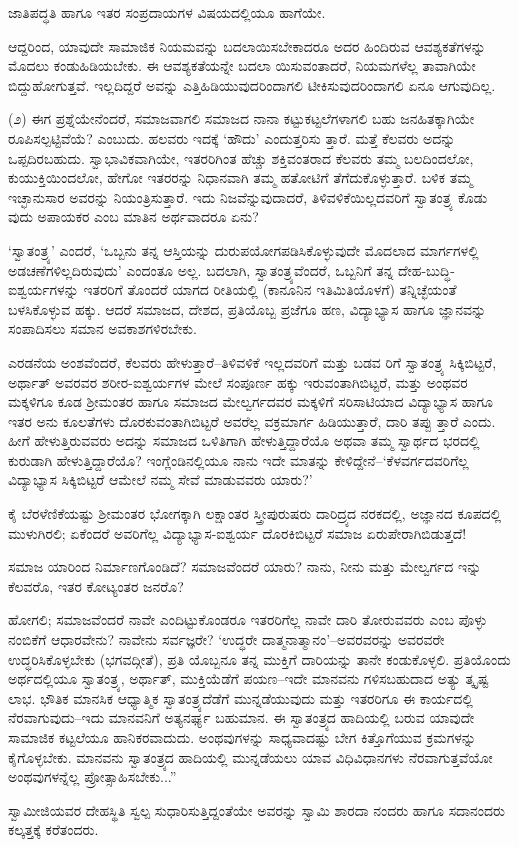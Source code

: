 ಜಾತಿಪದ್ಧತಿ ಹಾಗೂ ಇತರ ಸಂಪ್ರದಾಯಗಳ ವಿಷಯದಲ್ಲಿಯೂ ಹಾಗೆಯೇ.

ಆದ್ದರಿಂದ, ಯಾವುದೇ ಸಾಮಾಜಿಕ ನಿಯಮವನ್ನು ಬದಲಾಯಿಸಬೇಕಾದರೂ ಅದರ ಹಿಂದಿರುವ ಆವಶ್ಯಕತೆಗಳನ್ನು ಮೊದಲು ಕಂಡುಹಿಡಿಯಬೇಕು. ಈ ಆವಶ್ಯಕತೆಯನ್ನೇ ಬದಲಾ ಯಿಸುವಂತಾದರೆ, ನಿಯಮಗಳೆಲ್ಲ ತಾವಾಗಿಯೇ ಬಿದ್ದುಹೋಗುತ್ತವೆ. ಇಲ್ಲದಿದ್ದರೆ ಅವನ್ನು ಎತ್ತಿಹಿಡಿಯುವುದರಿಂದಾಗಲಿ ಟೀಕಿಸುವುದರಿಂದಾಗಲಿ ಏನೂ ಆಗುವುದಿಲ್ಲ.

(೨) ಈಗ ಪ್ರಶ್ನೆಯೇನೆಂದರೆ, ಸಮಾಜವಾಗಲಿ ಸಮಾಜದ ನಾನಾ ಕಟ್ಟುಕಟ್ಟಲೆಗಳಾಗಲಿ ಬಹು ಜನಹಿತಕ್ಕಾಗಿಯೇ ರೂಪಿಸಲ್ಪಟ್ಟಿವೆಯೆ? ಎಂಬುದು. ಹಲವರು ಇದಕ್ಕೆ ‘ಹೌದು’ ಎಂದುತ್ತರಿಸು ತ್ತಾರೆ. ಮತ್ತೆ ಕೆಲವರು ಅದನ್ನು ಒಪ್ಪದಿರಬಹುದು. ಸ್ವಾಭಾವಿಕವಾಗಿಯೇ, ಇತರರಿಗಿಂತ ಹೆಚ್ಚು ಶಕ್ತಿವಂತರಾದ ಕೆಲವರು ತಮ್ಮ ಬಲದಿಂದಲೋ, ಕುಯುಕ್ತಿಯಿಂದಲೋ, ಹೇಗೋ ಇತರರನ್ನು ನಿಧಾನವಾಗಿ ತಮ್ಮ ಹತೋಟಿಗೆ ತೆಗೆದುಕೊಳ್ಳುತ್ತಾರೆ. ಬಳಿಕ ತಮ್ಮ ಇಚ್ಛಾನುಸಾರ ಅವರನ್ನು ನಿಯಂತ್ರಿಸುತ್ತಾರೆ. ಇದು ನಿಜವೆನ್ನುವುದಾದರೆ, ತಿಳಿವಳಿಕೆಯಿಲ್ಲದವರಿಗೆ ಸ್ವಾತಂತ್ರ್ಯ ಕೊಡು ವುದು ಅಪಾಯಕರ ಎಂಬ ಮಾತಿನ ಅರ್ಥವಾದರೂ ಏನು?

‘ಸ್ವಾತಂತ್ರ್ಯ’ ಎಂದರೆ, ‘ಒಬ್ಬನು ತನ್ನ ಆಸ್ತಿಯನ್ನು ದುರುಪಯೋಗಪಡಿಸಿಕೊಳ್ಳುವುದೇ ಮೊದಲಾದ ಮಾರ್ಗಗಳಲ್ಲಿ ಅಡಚಣೆಗಳಿಲ್ಲದಿರುವುದು’ ಎಂದಂತೂ ಅಲ್ಲ. ಬದಲಾಗಿ, ಸ್ವಾತಂತ್ರ್ಯವೆಂದರೆ, ಒಬ್ಬನಿಗೆ ತನ್ನ ದೇಹ-ಬುದ್ಧಿ-ಐಶ್ವರ್ಯಗಳನ್ನು ಇತರರಿಗೆ ತೊಂದರೆ ಯಾಗದ ರೀತಿಯಲ್ಲಿ (ಕಾನೂನಿನ ಇತಿಮಿತಿಯೊಳಗೆ) ತನ್ನಿಚ್ಛೆಯಂತೆ ಬಳಸಿಕೊಳ್ಳುವ ಹಕ್ಕು. ಆದರೆ ಸಮಾಜದ, ದೇಶದ, ಪ್ರತಿಯೊಬ್ಬ ಪ್ರಜೆಗೂ ಹಣ, ವಿದ್ಯಾಭ್ಯಾಸ ಹಾಗೂ ಜ್ಞಾನವನ್ನು ಸಂಪಾದಿಸಲು ಸಮಾನ ಅವಕಾಶಗಳಿರಬೇಕು.

ಎರಡನೆಯ ಅಂಶವೆಂದರೆ, ಕೆಲವರು ಹೇಳುತ್ತಾರೆ–ತಿಳಿವಳಿಕೆ ಇಲ್ಲದವರಿಗೆ ಮತ್ತು ಬಡವ ರಿಗೆ ಸ್ವಾತಂತ್ರ್ಯ ಸಿಕ್ಕಿಬಿಟ್ಟರೆ, ಅರ್ಥಾತ್ ಅವರವರ ಶರೀರ-ಐಶ್ವರ್ಯಗಳ ಮೇಲೆ ಸಂಪೂರ್ಣ ಹಕ್ಕು ಇರುವಂತಾಗಿಬಿಟ್ಟರೆ, ಮತ್ತು ಅಂಥವರ ಮಕ್ಕಳಿಗೂ ಕೂಡ ಶ್ರೀಮಂತರ ಹಾಗೂ ಸಮಾಜದ ಮೇಲ್ವರ್ಗದವರ ಮಕ್ಕಳಿಗೆ ಸರಿಸಾಟಿಯಾದ ವಿದ್ಯಾಭ್ಯಾಸ ಹಾಗೂ ಇತರ ಅನು ಕೂಲತೆಗಳು ದೊರಕುವಂತಾಗಿಬಿಟ್ಟರೆ ಅವರೆಲ್ಲ ವಕ್ರಮಾರ್ಗ ಹಿಡಿಯುತ್ತಾರೆ, ದಾರಿ ತಪ್ಪು ತ್ತಾರೆ ಎಂದು. ಹೀಗೆ ಹೇಳುತ್ತಿರುವವರು ಅದನ್ನು ಸಮಾಜದ ಒಳಿತಿಗಾಗಿ ಹೇಳುತ್ತಿದ್ದಾರೆಯೊ ಅಥವಾ ತಮ್ಮ ಸ್ವಾರ್ಥದ ಭರದಲ್ಲಿ ಕುರುಡಾಗಿ ಹೇಳುತ್ತಿದ್ದಾರೆಯೊ? ಇಂಗ್ಲೆಂಡಿನಲ್ಲಿಯೂ ನಾನು ಇದೇ ಮಾತನ್ನು ಕೇಳಿದ್ದೇನೆ–‘ಕೆಳವರ್ಗದವರಿಗೆಲ್ಲ ವಿದ್ಯಾಭ್ಯಾಸ ಸಿಕ್ಕಿಬಿಟ್ಟರೆ ಆಮೇಲೆ ನಮ್ಮ ಸೇವೆ ಮಾಡುವವರು ಯಾರು?’

ಕೈ ಬೆರಳೆಣಿಕೆಯಷ್ಟು ಶ್ರೀಮಂತರ ಭೋಗಕ್ಕಾಗಿ ಲಕ್ಷಾಂತರ ಸ್ತ್ರೀಪುರುಷರು ದಾರಿದ್ರ್ಯದ ನರಕದಲ್ಲಿ, ಅಜ್ಞಾನದ ಕೂಪದಲ್ಲಿ ಮುಳುಗಿರಲಿ; ಏಕೆಂದರೆ ಅವರಿಗೆಲ್ಲ ವಿದ್ಯಾಭ್ಯಾಸ-ಐಶ್ವರ್ಯ ದೊರಕಿಬಿಟ್ಟರೆ ಸಮಾಜ ಏರುಪೇರಾಗಿಬಿಡುತ್ತದೆ!

ಸಮಾಜ ಯಾರಿಂದ ನಿರ್ಮಾಣಗೊಂಡಿದೆ? ಸಮಾಜವೆಂದರೆ ಯಾರು? ನಾನು, ನೀನು ಮತ್ತು ಮೇಲ್ವರ್ಗದ ಇನ್ನು ಕೆಲವರೊ, ಇತರ ಕೋಟ್ಯಂತರ ಜನರೊ?

ಹೋಗಲಿ; ಸಮಾಜವೆಂದರೆ ನಾವೇ ಎಂದಿಟ್ಟುಕೊಂಡರೂ ಇತರರಿಗೆಲ್ಲ ನಾವೇ ದಾರಿ ತೋರುವವರು ಎಂಬ ಪೊಳ್ಳು ನಂಬಿಕೆಗೆ ಆಧಾರವೇನು? ನಾವೇನು ಸರ್ವಜ್ಞರೇ? ‘ಉದ್ಧರೇ ದಾತ್ಮನಾತ್ಮಾನಂ’–ಅವರವರನ್ನು ಅವರವರೇ ಉದ್ಧರಿಸಿಕೊಳ್ಳಬೇಕು (ಭಗವದ್ಗೀತೆ), ಪ್ರತಿ ಯೊಬ್ಬನೂ ತನ್ನ ಮುಕ್ತಿಗೆ ದಾರಿಯನ್ನು ತಾನೇ ಕಂಡುಕೊಳ್ಳಲಿ. ಪ್ರತಿಯೊಂದು ಅರ್ಥದಲ್ಲಿಯೂ ಸ್ವಾತಂತ್ರ್ಯ, ಅರ್ಥಾತ್, ಮುಕ್ತಿಯೆಡೆಗೆ ಪಯಣ–ಇದೇ ಮಾನವನು ಗಳಿಸಬಹುದಾದ ಅತ್ಯು ತ್ಕೃಷ್ಟ ಲಾಭ. ಭೌತಿಕ ಮಾನಸಿಕ ಆಧ್ಯಾತ್ಮಿಕ ಸ್ವಾತಂತ್ರ್ಯದೆಡೆಗೆ ಮುನ್ನಡೆಯುವುದು ಮತ್ತು ಇತರರಿಗೂ ಈ ಕಾರ್ಯದಲ್ಲಿ ನೆರವಾಗುವುದು–ಇದು ಮಾನವನಿಗೆ ಅತ್ಯನರ್ಘ್ಯ ಬಹುಮಾನ. ಈ ಸ್ವಾತಂತ್ರ್ಯದ ಹಾದಿಯಲ್ಲಿ ಬರುವ ಯಾವುದೇ ಸಾಮಾಜಿಕ ಕಟ್ಟಲೆಯೂ ಹಾನಿಕರವಾದುದು. ಅಂಥವುಗಳನ್ನು ಸಾಧ್ಯವಾದಷ್ಟು ಬೇಗ ಕಿತ್ತೊಗೆಯುವ ಕ್ರಮಗಳನ್ನು ಕೈಗೊಳ್ಳಬೇಕು. ಮಾನವನು ಸ್ವಾತಂತ್ರ್ಯದ ಹಾದಿಯಲ್ಲಿ ಮುನ್ನಡೆಯಲು ಯಾವ ವಿಧಿವಿಧಾನಗಳು ನೆರವಾಗುತ್ತವೆಯೋ ಅಂಥವುಗಳನ್ನೆಲ್ಲ ಪ್ರೋತ್ಸಾಹಿಸಬೇಕು...”

ಸ್ವಾಮೀಜಿಯವರ ದೇಹಸ್ಥಿತಿ ಸ್ವಲ್ಪ ಸುಧಾರಿಸುತ್ತಿದ್ದಂತೆಯೇ ಅವರನ್ನು ಸ್ವಾಮಿ ಶಾರದಾ ನಂದರು ಹಾಗೂ ಸದಾನಂದರು ಕಲ್ಕತ್ತಕ್ಕೆ ಕರೆತಂದರು.

